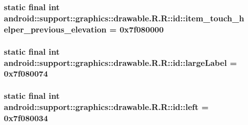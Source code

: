 \hypertarget{classandroid_1_1support_1_1graphics_1_1drawable_1_1_r_1_1id_002e7c928a6968ff2d47b76ff12550aa}{
\subsubsection[{item\_\-touch\_\-helper\_\-previous\_\-elevation}]{\setlength{\rightskip}{0pt plus 5cm}static final int android::support::graphics::drawable.R.R::id::item\_\-touch\_\-helper\_\-previous\_\-elevation = 0x7f080000}}
\label{classandroid_1_1support_1_1graphics_1_1drawable_1_1_r_1_1id_002e7c928a6968ff2d47b76ff12550aa}


\hypertarget{classandroid_1_1support_1_1graphics_1_1drawable_1_1_r_1_1id_7dbade53eab688cd964b899edf62adee}{
\subsubsection[{largeLabel}]{\setlength{\rightskip}{0pt plus 5cm}static final int android::support::graphics::drawable.R.R::id::largeLabel = 0x7f080074}}
\label{classandroid_1_1support_1_1graphics_1_1drawable_1_1_r_1_1id_7dbade53eab688cd964b899edf62adee}


\hypertarget{classandroid_1_1support_1_1graphics_1_1drawable_1_1_r_1_1id_2024fccaef81061bbc115dc8ae127edd}{
\subsubsection[{left}]{\setlength{\rightskip}{0pt plus 5cm}static final int android::support::graphics::drawable.R.R::id::left = 0x7f080034}}
\label{classandroid_1_1support_1_1graphics_1_1drawable_1_1_r_1_1id_2024fccaef81061bbc115dc8ae127edd}


